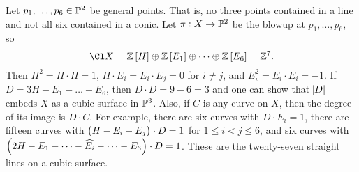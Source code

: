 \begin{example*}
Let $ p_1, \dots, p_6 \in \mathbb{P}^2 $ be general points. That is, no three points contained in a line and not all six contained in a conic. Let $ \pi : X \to \mathbb{P}^2 $ be the blowup at $ p_1, \dots, p_6 $, so
$$ \Cl X = \ZZ\sbr{H} \oplus \ZZ\sbr{E_1} \oplus \dots \oplus \ZZ\sbr{E_6} = \ZZ^7. $$
Then $ H^2 = H \cdot H = 1 $, $ H \cdot E_i = E_i \cdot E_j = 0 $ for $ i \ne j $, and $ E_i^2 = E_i \cdot E_i = -1 $. If $ D = 3H - E_1 - \dots - E_6 $, then $ D \cdot D = 9 - 6 = 3 $ and one can show that $ \abs{D} $ embeds $ X $ as a cubic surface in $ \mathbb{P}^3 $. Also, if $ C $ is any curve on $ X $, then the degree of its image is $ D \cdot C $. For example, there are six curves with $ D \cdot E_i = 1 $, there are fifteen curves with $ \br{H - E_i - E_j} \cdot D = 1 $ for $ 1 \le i < j \le 6 $, and six curves with $ \br{2H - E_1 - \dots - \widehat{E_i} - \dots - E_6} \cdot D = 1 $. These are the twenty-seven straight lines on a cubic surface.
\end{example*}

